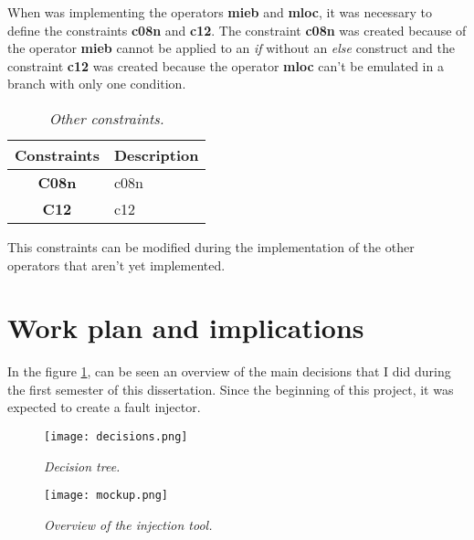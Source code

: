 When was implementing the operators \textbf{\ac{mieb}} and \textbf{\ac{mloc}}, it was necessary to define the constraints \textbf{\ac{c08n}} and \textbf{\ac{c12}}. The constraint \textbf{\ac{c08n}} was created because of the operator \textbf{\ac{mieb}} cannot be applied to an \textit{if} without an \textit{else} construct and the constraint \textbf{\ac{c12}} was created because the operator \textbf{\ac{mloc}} can't be emulated in a branch with only one condition.

\begin{table}[!ht]
\centering
\begin{tabular}{|c|p{12cm}|}
\hline
\textbf{Constraints}            & \multicolumn{1}{c|}{\textbf{Description}}                                     \\ \hline \hline
\textbf{C08n}         & \Acl{c08n} \\ \hline
\textbf{C12}         & \Acl{c12} \\ \hline
\end{tabular}
\caption{\small \sl Other constraints.\label{tab:otherConstraints}}
\end{table}

This constraints can be modified during the implementation of the other operators that aren't yet implemented.

\clearpage
\section{Work plan and implications}

In the figure \ref{fig:decisions}, can be seen an overview of the main decisions that I did during the first semester of this dissertation. Since the beginning of this project, it was expected to create a fault injector.

\begin{figure}[!ht]
\begin{center}
\texttt{[image: decisions.png]}
\caption{\small \sl Decision tree.\label{fig:decisions}}
\end{center}
\end{figure}

\begin{figure}[!ht]
\begin{center}
\texttt{[image: mockup.png]}
\caption{\small \sl Overview of the injection tool.\label{fig:mockup}}
\end{center}
\end{figure}

